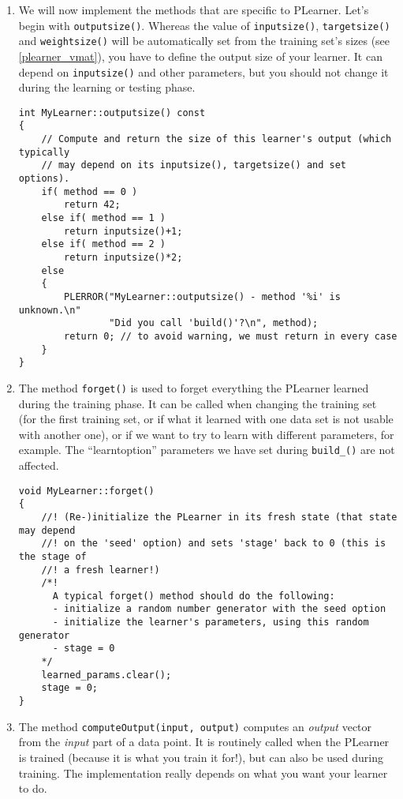 \documentclass[11pt]{book}
\begin{document}
\begin{enumerate}
\item We will now implement the methods that are specific to
PLearner. Let's begin with {\tt outputsize()}. Whereas the value
of {\tt inputsize()}, {\tt targetsize()} and {\tt weightsize()}
will be automatically set from the training set's sizes (see
\ref{plearner_vmat}), you have to define the output size of your
learner. It can depend on {\tt inputsize()} and other parameters, but
you should not change it during the learning or testing phase.
\begin{verbatim}
int MyLearner::outputsize() const
{
    // Compute and return the size of this learner's output (which typically
    // may depend on its inputsize(), targetsize() and set options).
    if( method == 0 )
        return 42;
    else if( method == 1 )
        return inputsize()+1;
    else if( method == 2 )
        return inputsize()*2;
    else
    {
        PLERROR("MyLearner::outputsize() - method '%i' is unknown.\n"
                "Did you call 'build()'?\n", method);
        return 0; // to avoid warning, we must return in every case
    }
}
\end{verbatim}

\item The method {\tt forget()} is used to forget everything the
PLearner learned during the training phase. It can be called when
changing the training set (for the first training set, or if what
it learned with one data set is not usable with another one), or if
we want to try to learn with different parameters, for example. The
``learntoption'' parameters we have set during {\tt build\_()} are not
affected.
\begin{verbatim}
void MyLearner::forget()
{
    //! (Re-)initialize the PLearner in its fresh state (that state may depend
    //! on the 'seed' option) and sets 'stage' back to 0 (this is the stage of
    //! a fresh learner!)
    /*!
      A typical forget() method should do the following:
      - initialize a random number generator with the seed option
      - initialize the learner's parameters, using this random generator
      - stage = 0
    */
    learned_params.clear();
    stage = 0;
}
\end{verbatim}

\item The method {\tt computeOutput(input, output)} computes an {\em
output} vector from the {\em input} part of a data point. It is
routinely called when the PLearner is trained (because it is what you
train it for!), but can also be used during training. The implementation
really depends on what you want your learner to do.


\end{enumerate}
\end{document}
